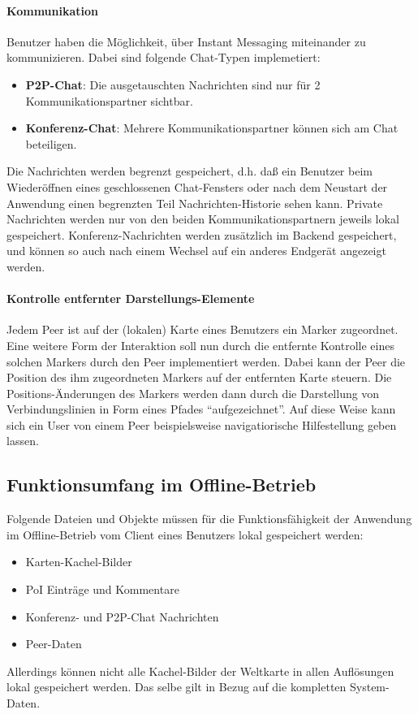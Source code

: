\paragraph{Kommunikation}
Benutzer haben die Möglichkeit, über Instant Messaging miteinander zu kommunizieren. Dabei sind
folgende Chat-Typen implemetiert:
\begin{itemize}[leftmargin=*,noitemsep,topsep=1ex,parsep=0pt,partopsep=0pt]
\item \textbf{P2P-Chat}: Die ausgetauschten Nachrichten sind nur für 2 Kommunikationspartner sichtbar.
\item \textbf{Konferenz-Chat}: Mehrere Kommunikationspartner können sich am Chat beteiligen.
\end{itemize}
Die Nachrichten werden begrenzt gespeichert, d.h. daß ein Benutzer beim Wiederöffnen eines  geschlossenen Chat-Fensters oder nach dem Neustart der Anwendung einen begrenzten Teil Nachrichten-Historie sehen kann.
Private Nachrichten werden nur von den beiden Kommunikationspartnern jeweils lokal gespeichert. Konferenz-Nachrichten werden zusätzlich im Backend gespeichert, und können so auch nach einem Wechsel auf ein anderes Endgerät angezeigt werden.

\paragraph{Kontrolle entfernter Darstellungs-Elemente}
Jedem Peer ist auf der (lokalen) Karte eines Benutzers ein Marker zugeordnet. 
Eine weitere Form der Interaktion soll nun durch die entfernte Kontrolle eines solchen Markers durch den Peer implementiert werden. Dabei kann der Peer die Position des ihm zugeordneten Markers auf der entfernten Karte steuern. Die Positions-Änderungen des Markers werden dann durch die Darstellung von Verbindungslinien in Form eines Pfades "`aufgezeichnet"'. Auf diese Weise kann sich ein User von einem Peer beispielsweise navigatiorische Hilfestellung geben lassen.

\subsection{Funktionsumfang im Offline-Betrieb}
Folgende Dateien und Objekte müssen für die Funktionsfähigkeit der Anwendung im Offline-Betrieb vom Client eines Benutzers lokal gespeichert werden:
\begin{itemize}
  \item Karten-Kachel-Bilder
  \item PoI Einträge und Kommentare
  \item Konferenz- und P2P-Chat Nachrichten
  \item Peer-Daten
\end{itemize}
Allerdings können nicht alle Kachel-Bilder der Weltkarte in allen Auflösungen lokal gespeichert werden.
Das selbe gilt in Bezug auf die kompletten System-Daten. 

